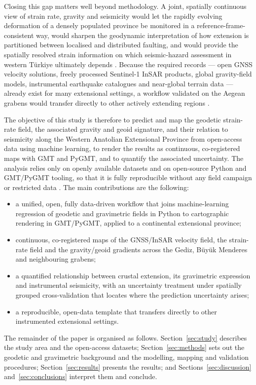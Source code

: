 \documentclass[pdflatex,sn-mathphys-num]{sn-jnl}%
\theoremstyle{thmstyleone}%
\theoremstyle{thmstyletwo}%
\theoremstyle{thmstylethree}%
\begin{document}
Closing this gap matters well beyond methodology. A joint, spatially continuous view
of strain rate, gravity and seismicity would let the rapidly evolving deformation of
a densely populated province be monitored in a reference-frame-consistent way, would
sharpen the geodynamic interpretation of how extension is partitioned between
localised and distributed faulting, and would provide the spatially resolved strain
information on which seismic-hazard assessment in western T\"{u}rkiye ultimately
depends \cite{Hussain2018,Ergintav2023,Lemenkova202606,Briole2021,Kurt2023}. Because the required
records --- open GNSS velocity solutions, freely processed Sentinel-1 InSAR
products, global gravity-field models, instrumental earthquake catalogues and
near-global terrain data --- already exist for many extensional settings, a workflow
validated on the Aegean grabens would transfer directly to other actively extending
regions \cite{Kurt2023,Lazecky2020,Pavlis2012}.

The objective of this study is therefore to predict and map the geodetic
strain-rate field, the associated gravity and geoid signature, and their relation to
seismicity along the Western Anatolian Extensional Province from open-access data
using machine learning, to render the results as continuous, co-registered maps with
GMT and PyGMT, and to quantify the associated uncertainty. The analysis relies only
on openly available datasets and on open-source Python and GMT/PyGMT tooling, so that
it is fully reproducible without any field campaign or restricted data
\cite{Wessel2019,Harris2020,Pedregosa2011}. The main contributions are the
following:
\begin{itemize}
  \item a unified, open, fully data-driven workflow that joins machine-learning
        regression of geodetic and gravimetric fields in Python to cartographic
        rendering in GMT/PyGMT, applied to a continental extensional province;
  \item continuous, co-registered maps of the GNSS/InSAR velocity field, the
        strain-rate field and the gravity/geoid gradients across the Gediz,
        B\"{u}y\"{u}k Menderes and neighbouring grabens;
  \item a quantified relationship between crustal extension, its gravimetric
        expression and instrumental seismicity, with an uncertainty treatment under
        spatially grouped cross-validation that locates where the prediction
        uncertainty arises;
  \item a reproducible, open-data template that transfers directly to other
        instrumented extensional settings.
\end{itemize}
The remainder of the paper is organised as follows. Section~\ref{sec:study}
describes the study area and the open-access datasets; Section~\ref{sec:methods}
sets out the geodetic and gravimetric background and the modelling, mapping and
validation procedures; Section~\ref{sec:results} presents the results;
and Sections~\ref{sec:discussion} and~\ref{sec:conclusions} interpret them and
conclude.
\end{document}
